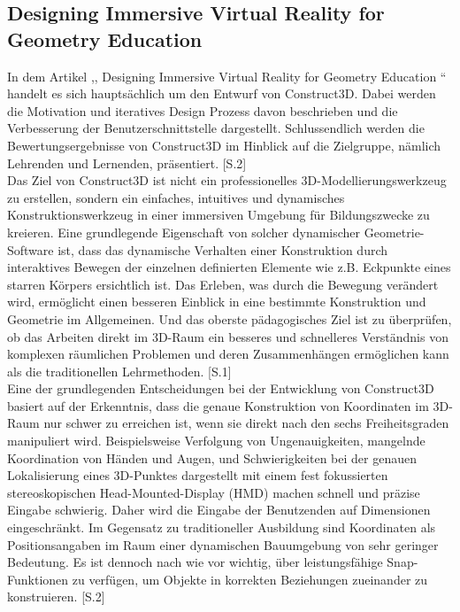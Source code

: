 \documentclass[deutsch]{llncs}
\begin{document}
\subsection{Designing Immersive Virtual Reality for Geometry Education}
\label{subsec:}
In dem Artikel ,, Designing Immersive Virtual Reality for Geometry Education “ handelt es sich hauptsächlich um den Entwurf von Construct3D. Dabei werden die Motivation und iteratives Design Prozess davon beschrieben und die Verbesserung der Benutzerschnittstelle dargestellt. Schlussendlich werden die Bewertungsergebnisse von Construct3D im Hinblick auf die Zielgruppe, nämlich Lehrenden und Lernenden, präsentiert. [S.2] \\
Das Ziel von Construct3D ist nicht ein professionelles 3D-Modellierungswerkzeug zu erstellen, sondern ein einfaches, intuitives und dynamisches Konstruktionswerkzeug in einer immersiven Umgebung für Bildungszwecke zu kreieren. Eine grundlegende Eigenschaft von solcher dynamischer Geometrie-Software ist, dass das dynamische Verhalten einer Konstruktion durch interaktives Bewegen der einzelnen definierten Elemente wie z.B. Eckpunkte eines starren Körpers ersichtlich ist. Das Erleben, was durch die Bewegung verändert wird, ermöglicht einen besseren Einblick in eine bestimmte Konstruktion und Geometrie im Allgemeinen. Und das oberste pädagogisches Ziel ist zu überprüfen, ob das Arbeiten direkt im 3D-Raum ein besseres und schnelleres Verständnis von komplexen räumlichen Problemen und deren Zusammenhängen ermöglichen kann als die traditionellen Lehrmethoden. [S.1]\\
Eine der grundlegenden Entscheidungen bei der Entwicklung von Construct3D basiert auf der Erkenntnis, dass die genaue Konstruktion von Koordinaten im 3D-Raum nur schwer zu erreichen ist, wenn sie direkt nach den sechs Freiheitsgraden manipuliert wird. Beispielsweise Verfolgung von Ungenauigkeiten, mangelnde Koordination von Händen und Augen, und Schwierigkeiten bei der genauen Lokalisierung eines 3D-Punktes dargestellt mit einem fest fokussierten stereoskopischen Head-Mounted-Display (HMD) machen schnell und präzise Eingabe schwierig. Daher wird die Eingabe der Benutzenden auf Dimensionen eingeschränkt. Im Gegensatz zu traditioneller Ausbildung sind Koordinaten als Positionsangaben im Raum einer dynamischen Bauumgebung von sehr geringer Bedeutung. Es ist dennoch nach wie vor wichtig, über leistungsfähige Snap-Funktionen zu verfügen, um Objekte in korrekten Beziehungen zueinander zu konstruieren. [S.2]\\
\end{document}
